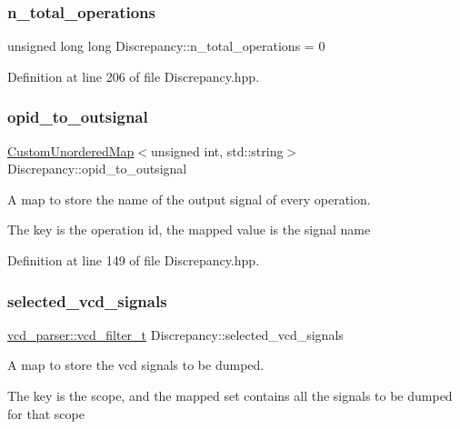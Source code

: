 \subsubsection{\texorpdfstring{n\+\_\+total\+\_\+operations}{n\_total\_operations}}
{\footnotesize\ttfamily unsigned long long Discrepancy\+::n\+\_\+total\+\_\+operations = 0}



Definition at line 206 of file Discrepancy.\+hpp.

\mbox{\label{structDiscrepancy_a67ee727c44bf0c2e7e5995d67e7099d3}} 
\subsubsection{\texorpdfstring{opid\+\_\+to\+\_\+outsignal}{opid\_to\_outsignal}}
{\footnotesize\ttfamily \hyperlink{custom__map_8hpp_ad1ed68f2ff093683ab1a33522b144adc}{Custom\+Unordered\+Map}$<$unsigned int, std\+::string$>$ Discrepancy\+::opid\+\_\+to\+\_\+outsignal}



A map to store the name of the output signal of every operation. 

The key is the operation id, the mapped value is the signal name 

Definition at line 149 of file Discrepancy.\+hpp.

\mbox{\label{structDiscrepancy_af3c55dd244654a9c89dc7e41f8909664}} 
\subsubsection{\texorpdfstring{selected\+\_\+vcd\+\_\+signals}{selected\_vcd\_signals}}
{\footnotesize\ttfamily \hyperlink{classvcd__parser_a00f10dd896fdc534014c6192eed18d55}{vcd\+\_\+parser\+::vcd\+\_\+filter\+\_\+t} Discrepancy\+::selected\+\_\+vcd\+\_\+signals}



A map to store the vcd signals to be dumped. 

The key is the scope, and the mapped set contains all the signals to be dumped for that scope 

